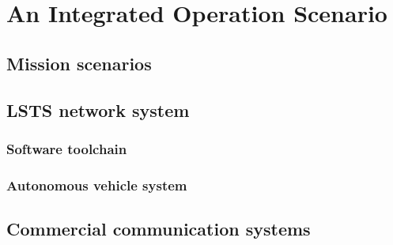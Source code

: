%
%
%


\chapter{An Integrated Operation Scenario}
\label{chp:NetworkOp}


\section{Mission scenarios}
\label{sec:NetworkOp_Scenarios}

\lipsum


\section{LSTS network system}
\label{sec:NetworkOp_LSTS}

\lipsum

\subsection{Software toolchain}

\lipsum

\subsection{Autonomous vehicle system}

\lipsum


\section{Commercial communication systems}
\label{sec:NetworkOp_CommercialComms}

